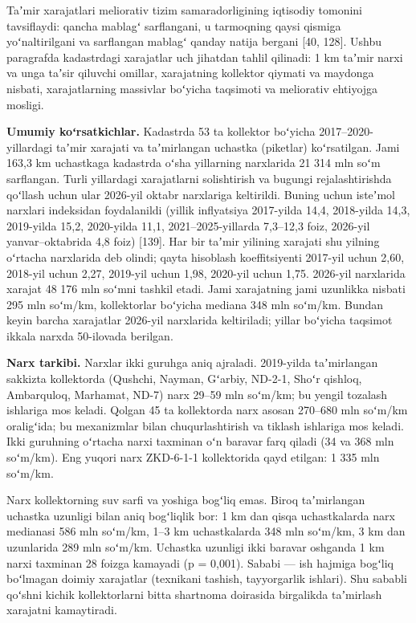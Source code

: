
Taʼmir xarajatlari meliorativ tizim samaradorligining iqtisodiy tomonini
tavsiflaydi: qancha mablagʻ sarflangani, u tarmoqning qaysi qismiga
yoʻnaltirilgani va sarflangan mablagʻ qanday natija bergani {[}40,
128{]}. Ushbu paragrafda kadastrdagi xarajatlar uch jihatdan tahlil
qilinadi: 1 km taʼmir narxi va unga taʼsir qiluvchi omillar, xarajatning
kollektor qiymati va maydonga nisbati, xarajatlarning massivlar boʻyicha
taqsimoti va meliorativ ehtiyojga mosligi.

\textbf{Umumiy koʻrsatkichlar.} Kadastrda 53 ta kollektor boʻyicha
2017--2020-yillardagi taʼmir xarajati va taʼmirlangan uchastka
(piketlar) koʻrsatilgan. Jami 163,3 km uchastkaga kadastrda oʻsha
yillarning narxlarida 21 314 mln soʻm sarflangan. Turli yillardagi
xarajatlarni solishtirish va bugungi rejalashtirishda qoʻllash uchun
ular 2026-yil oktabr narxlariga keltirildi. Buning uchun isteʼmol
narxlari indeksidan foydalanildi (yillik inflyatsiya 2017-yilda 14,4,
2018-yilda 14,3, 2019-yilda 15,2, 2020-yilda 11,1, 2021--2025-yillarda
7,3--12,3 foiz, 2026-yil yanvar--oktabrida 4,8 foiz) {[}139{]}. Har bir
taʼmir yilining xarajati shu yilning oʻrtacha narxlarida deb olindi;
qayta hisoblash koeffitsiyenti 2017-yil uchun 2,60, 2018-yil uchun 2,27,
2019-yil uchun 1,98, 2020-yil uchun 1,75. 2026-yil narxlarida xarajat 48
176 mln soʻmni tashkil etadi. Jami xarajatning jami uzunlikka nisbati
295 mln soʻm/km, kollektorlar boʻyicha mediana 348 mln soʻm/km. Bundan
keyin barcha xarajatlar 2026-yil narxlarida keltiriladi; yillar boʻyicha
taqsimot ikkala narxda 50-ilovada berilgan.

\textbf{Narx tarkibi.} Narxlar ikki guruhga aniq ajraladi. 2019-yilda
taʼmirlangan sakkizta kollektorda (Qushchi, Nayman, Gʻarbiy, ND-2-1,
Shoʻr qishloq, Ambarquloq, Marhamat, ND-7) narx 29--59 mln soʻm/km; bu
yengil tozalash ishlariga mos keladi. Qolgan 45 ta kollektorda narx
asosan 270--680 mln soʻm/km oraligʻida; bu mexanizmlar bilan
chuqurlashtirish va tiklash ishlariga mos keladi. Ikki guruhning
oʻrtacha narxi taxminan oʻn baravar farq qiladi (34 va 368 mln soʻm/km).
Eng yuqori narx ZKD-6-1-1 kollektorida qayd etilgan: 1 335 mln soʻm/km.

Narx kollektorning suv sarfi va yoshiga bogʻliq emas. Biroq taʼmirlangan
uchastka uzunligi bilan aniq bogʻliqlik bor: 1 km dan qisqa
uchastkalarda narx medianasi 586 mln soʻm/km, 1--3 km uchastkalarda 348
mln soʻm/km, 3 km dan uzunlarida 289 mln soʻm/km. Uchastka uzunligi ikki
baravar oshganda 1 km narxi taxminan 28 foizga kamayadi (p = 0,001).
Sababi --- ish hajmiga bogʻliq boʻlmagan doimiy xarajatlar (texnikani
tashish, tayyorgarlik ishlari). Shu sababli qoʻshni kichik
kollektorlarni bitta shartnoma doirasida birgalikda taʼmirlash xarajatni
kamaytiradi.

